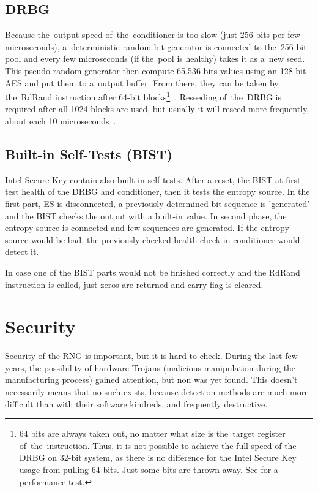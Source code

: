 \subsection{DRBG}\label{subsec:DRBG}
\par{
Because the~output speed of~the~conditioner is too slow (just 256 bits per few 
microseconds), 
a~deterministic random bit generator is connected to the~256 bit pool 
and every few microseconds (if the~pool is healthy) takes it as a~new seed. 
This pseudo random generator then compute 65.536 bits values using 
an 128-bit AES and put them to a~output buffer. 
From there, they can be taken by the~RdRand instruction after 64-bit 
blocks\footnote{64 bits are always taken out, no matter what size is 
the~target register of~the~instruction. Thus, it is not possible to achieve the full 
speed of the DRBG on 32-bit system, as there is no difference for the Intel 
Secure Key usage from pulling 64 bits. Just some bits are thrown away. 
See  for a performance test.}~\cite{AnalysisOfDRNG,UnderstandingRdRandElectronic}. 
Reseeding of~the~DRBG is required after all 1024 blocks are used, 
but usually it will reseed more frequently, 
about each 10 microseconds~\cite[Chapter~4.4]{IntelDRNGGuide}.
}
\subsection{Built-in Self-Tests (BIST)}
\par{
Intel Secure Key contain also built-in self tests. After a reset, the BIST at first test 
health of the DRBG and conditioner, then it tests the entropy source. In the first 
part, ES is disconnected, a previously determined bit sequence is 'generated' 
and the BIST checks the output with a built-in value. In second phase, 
the entropy source is connected and few sequences are generated. 
If the entropy source would be bad, the previously checked health check in conditioner would detect it. 
}

\par{
In case one of the BIST parts would not be finished correctly and the RdRand 
instruction is called, just zeros are returned and carry flag is cleared\cite{AnalysisOfDRNG}.
}
\section{Security}\label{sec:security}
\par{
Security of the RNG is important, but it is hard to check. During the last few years,
 the possibility of hardware Trojans (malicious manipulation during 
 the manufacturing process) gained attention, but non was yet found. This doesn't 
necessarily means that no such exists, because detection methods are 
much more difficult than with their software kindreds, and frequently destructive. 
}

